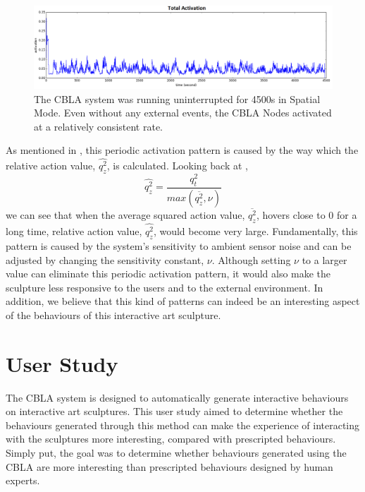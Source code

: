 \begin{figure} [!htb]
	\centering
	\includegraphics[width=1.0\textwidth]{"fig/validations/multi-cluster experiment cyclic activation"}
	\caption[Periodic spontaneous activation over a period of 4500s]{The CBLA system was running uninterrupted for 4500s in Spatial Mode. Even without any external events, the CBLA Nodes activated at a relatively consistent rate.}
	\label{fig:multi-cluster experiment cyclic activation}
\end{figure}

As mentioned in , this periodic activation pattern is caused by the way which the relative action value, $\widehat{q^2_z}$, is calculated. Looking back at 
, \[\widehat{q^2_z} = \frac{q_t^2}{max(\overline{q^2_z}, \nu)}\] we can see that when the average squared action value, $\overline{q^2_z}$, hovers close to 0 for a long time, relative action value, $\widehat{q^2_z}$, would become very large. Fundamentally, this pattern is caused by the system's sensitivity to ambient sensor noise and can be adjusted by changing the sensitivity constant, $\nu$. Although setting $\nu$ to a larger value can eliminate this periodic activation pattern, it would also make the sculpture less responsive to the users and to the external environment. In addition, we believe that this kind of patterns can indeed be an interesting aspect of the behaviours of this interactive art sculpture. 


\section{User Study}\label{sec:user-study}

The CBLA system is designed to automatically generate interactive behaviours on interactive art sculptures. This user study aimed to determine whether the behaviours generated through this method can make the experience of interacting with the sculptures more interesting, compared with prescripted behaviours. Simply put, the goal was to determine whether behaviours generated using the CBLA are more interesting than prescripted behaviours designed by human experts. 

